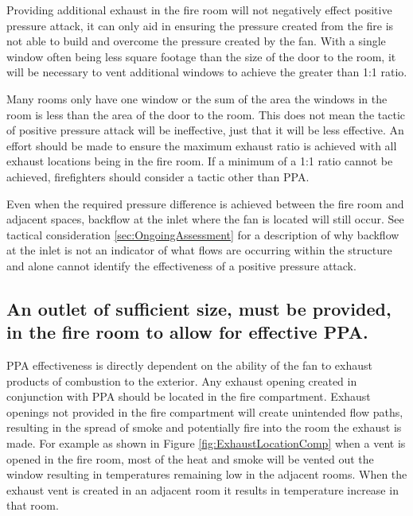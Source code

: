 \documentclass{article}
\begin{document}
Providing additional exhaust in the fire room will not negatively effect positive pressure attack, it can only aid in ensuring the pressure created from the fire is not able to build and overcome the pressure created by the fan. With a single window often being less square footage than the size of the door to the room, it will be necessary to vent additional windows to achieve the greater than 1:1 ratio. 

Many rooms only have one window or the sum of the area the windows in the room is less than the area of the door to the room. This does not mean the tactic of positive pressure attack will be ineffective, just that it will be less effective. An effort should be made to ensure the maximum exhaust ratio is achieved with all exhaust locations being in the fire room. If a minimum of a 1:1 ratio cannot be achieved, firefighters should consider a tactic other than PPA. 

Even when the required pressure difference is achieved between the fire room and adjacent spaces, backflow at the inlet where the fan is located will still occur. See tactical consideration \ref{sec:OngoingAssessment} for a description of why backflow at the inlet is not an indicator of what flows are occurring within the structure and alone cannot identify the effectiveness of a positive pressure attack.

\subsection{An outlet of sufficient size, must be provided, in the fire room to allow for effective PPA.} \label{sec:OutletInFireRoom}
PPA effectiveness is directly dependent on the ability of the fan to exhaust products of combustion to the exterior. Any exhaust opening created in conjunction with PPA should be located in the fire compartment. Exhaust openings not provided in the fire compartment will create unintended flow paths, resulting in the spread of smoke and potentially fire into the room the exhaust is made. For example as shown in Figure \ref{fig:ExhaustLocationComp} when a vent is opened in the fire room, most of the heat and smoke will be vented out the window resulting in temperatures remaining low in the adjacent rooms. When the exhaust vent is created in an adjacent room it results in temperature increase in that room.
\end{document}
